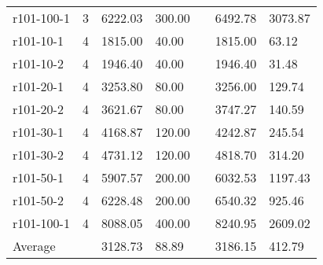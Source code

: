 \documentclass[final,5p,times,twocolumn]{elsarticle}
\begin{document}
{{{{{{\begin{table}[htbp]
\begin{tabular}{l l l l l l l}
r101-100-1&3&6222.03&300.00&&6492.78&3073.87\\
r101-10-1&4&1815.00&40.00&&1815.00&63.12\\
r101-10-2&4&1946.40&40.00&&1946.40&31.48\\
r101-20-1&4&3253.80&80.00&&3256.00&129.74\\
r101-20-2&4&3621.67&80.00&&3747.27&140.59\\
r101-30-1&4&4168.87&120.00&&4242.87&245.54\\
r101-30-2&4&4731.12&120.00&&4818.70&314.20\\
r101-50-1&4&5907.57&200.00&&6032.53&1197.43\\
r101-50-2&4&6228.48&200.00&&6540.32&925.46\\
r101-100-1&4&8088.05&400.00&&8240.95&2609.02\\
\hline
Average&&3128.73&88.89&&3186.15&412.79\\
\hline
\end{tabular}
\label{tab:pt100_20}
\end{table}

}}}}}}
\end{document}
